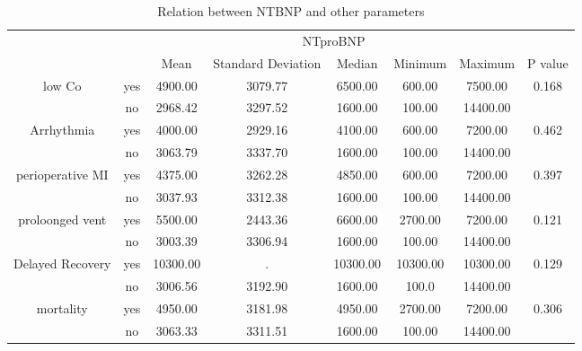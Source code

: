 \documentclass[14pt,a4paper,onecolumn]{extarticle}
\begin{document}
\begin{table}[]
\centering
\caption{Relation between NTBNP and other parameters}
\label{Result_relation_parameters}
\begin{tabular}{cccccccc}
\hline
                                  &     & \multicolumn{5}{c}{NTproBNP}                                   &                        \\
                                  &     & Mean     & Standard Deviation & Median   & Minimum  & Maximum  & P value                \\ \hline
\multirow{2}{*}{low Co}           & yes & 4900.00  & 3079.77            & 6500.00  & 600.00   & 7500.00  & \multirow{2}{*}{0.168} \\
                                  & no  & 2968.42  & 3297.52            & 1600.00  & 100.00   & 14400.00 &                        \\
\multirow{2}{*}{Arrhythmia}       & yes & 4000.00  & 2929.16            & 4100.00  & 600.00   & 7200.00  & \multirow{2}{*}{0.462} \\
                                  & no  & 3063.79  & 3337.70            & 1600.00  & 100.00   & 14400.00 &                        \\
\multirow{2}{*}{perioperative MI} & yes & 4375.00  & 3262.28            & 4850.00  & 600.00   & 7200.00  & \multirow{2}{*}{0.397} \\
                                  & no  & 3037.93  & 3312.38            & 1600.00  & 100.00   & 14400.00 &                        \\
\multirow{2}{*}{proloonged vent}  & yes & 5500.00  & 2443.36            & 6600.00  & 2700.00  & 7200.00  & \multirow{2}{*}{0.121} \\
                                  & no  & 3003.39  & 3306.94            & 1600.00  & 100.00   & 14400.00 &                        \\
\multirow{2}{*}{Delayed Recovery} & yes & 10300.00 & .                  & 10300.00 & 10300.00 & 10300.00 & \multirow{2}{*}{0.129} \\
                                  & no  & 3006.56  & 3192.90            & 1600.00  & 100.0    & 14400.00 &                        \\
\multirow{2}{*}{mortality}        & yes & 4950.00  & 3181.98            & 4950.00  & 2700.00  & 7200.00  & \multirow{2}{*}{0.306} \\
                                  & no  & 3063.33  & 3311.51            & 1600.00  & 100.00   & 14400.00 &

\end{tabular}
\end{table}
\end{document}
